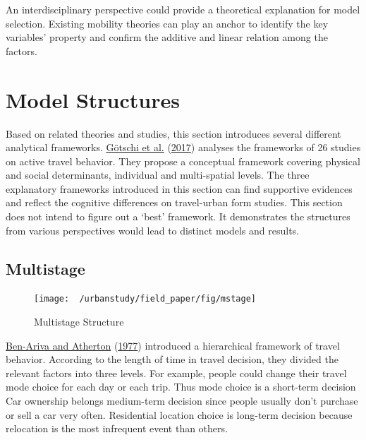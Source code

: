 \documentclass[
  11pt,
  openany]{memoir}
\begin{document}
An interdisciplinary perspective could provide a theoretical explanation for model selection. Existing mobility theories can play an anchor to identify the key variables' property and confirm the additive and linear relation among the factors.

\hypertarget{struc}{%
\chapter{Model Structures}\label{struc}}

Based on related theories and studies, this section introduces several different analytical frameworks. \protect\hyperlink{ref-gotschiComprehensiveConceptualFramework2017}{Götschi et al.} (\protect\hyperlink{ref-gotschiComprehensiveConceptualFramework2017}{2017}) analyses the frameworks of 26 studies on active travel behavior. They propose a conceptual framework covering physical and social determinants, individual and multi-spatial levels. The three explanatory frameworks introduced in this section can find supportive evidences and reflect the cognitive differences on travel-urban form studies. This section does not intend to figure out a `best' framework. It demonstrates the structures from various perspectives would lead to distinct models and results.

\hypertarget{multistage}{%
\section{Multistage}\label{multistage}}

\begin{figure}

{\centering \texttt{[image: ~/urbanstudy/field\_paper/fig/mstage]} 

}

\caption{Multistage Structure}\label{fig:Mstage}
\end{figure}

\protect\hyperlink{ref-ben-arivaMETHODOLOGYSHORTRANGETRAVEL1977}{Ben-Ariva and Atherton} (\protect\hyperlink{ref-ben-arivaMETHODOLOGYSHORTRANGETRAVEL1977}{1977}) introduced a hierarchical framework of travel behavior. According to the length of time in travel decision, they divided the relevant factors into three levels. For example, people could change their travel mode choice for each day or each trip. Thus mode choice is a short-term decision
Car ownership belongs medium-term decision since people usually don't purchase or sell a car very often.
Residential location choice is long-term decision because relocation is the most infrequent event than others.
\end{document}
